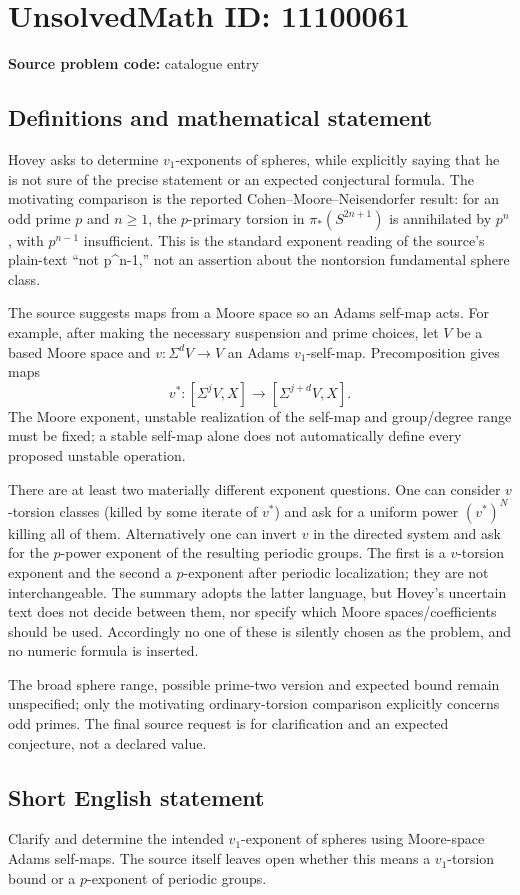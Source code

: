 \documentclass[11pt]{article}
\begin{document}
\section*{UnsolvedMath ID: 11100061}
\textbf{Source problem code:} catalogue entry
\subsection{Definitions and mathematical statement}
Hovey asks to determine \(v_1\)-exponents of spheres, while explicitly saying that he is not sure of the precise statement or an expected conjectural formula. The motivating comparison is the reported Cohen--Moore--Neisendorfer result: for an odd prime \(p\) and \(n\geq1\), the \(p\)-primary torsion in \(\pi_*(S^{2n+1})\) is annihilated by \(p^n\), with \(p^{n-1}\) insufficient. This is the standard exponent reading of the source's plain-text ``not p\^{}n-1,'' not an assertion about the nontorsion fundamental sphere class.

The source suggests maps from a Moore space so an Adams self-map acts. For example, after making the necessary suspension and prime choices, let \(V\) be a based Moore space and \(v:\Sigma^dV\to V\) an Adams \(v_1\)-self-map. Precomposition gives maps
\[v^*:[\Sigma^jV,X]\to[\Sigma^{j+d}V,X].\]
The Moore exponent, unstable realization of the self-map and group/degree range must be fixed; a stable self-map alone does not automatically define every proposed unstable operation.

There are at least two materially different exponent questions. One can consider \(v\)-torsion classes (killed by some iterate of \(v^*\)) and ask for a uniform power \((v^*)^N\) killing all of them. Alternatively one can invert \(v\) in the directed system and ask for the \(p\)-power exponent of the resulting periodic groups. The first is a \(v\)-torsion exponent and the second a \(p\)-exponent after periodic localization; they are not interchangeable. The summary adopts the latter language, but Hovey's uncertain text does not decide between them, nor specify which Moore spaces/coefficients should be used. Accordingly no one of these is silently chosen as the problem, and no numeric formula is inserted.

The broad sphere range, possible prime-two version and expected bound remain unspecified; only the motivating ordinary-torsion comparison explicitly concerns odd primes. The final source request is for clarification and an expected conjecture, not a declared value.
\subsection{Short English statement}
Clarify and determine the intended \(v_1\)-exponent of spheres using Moore-space Adams self-maps. The source itself leaves open whether this means a \(v_1\)-torsion bound or a \(p\)-exponent of periodic groups.
\end{document}

